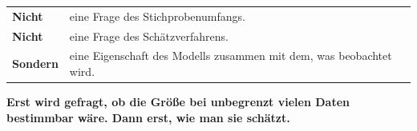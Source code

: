 \begin{merksatz}
\begin{center}
{\small
\renewcommand{\arraystretch}{1.52}
\begin{tabular}{@{}P{2.4cm}P{6.2cm}@{}}
\toprule
\textbf{Nicht} & eine Frage des Stichprobenumfangs.\\
\textbf{Nicht} & eine Frage des Schätzverfahrens.\\
\textbf{Sondern} & eine Eigenschaft des Modells zusammen mit dem, was beobachtet wird.\\
\bottomrule
\end{tabular}}
\end{center}

\begin{center}
\begin{minipage}{0.9\textwidth}
\textbf{Erst wird gefragt, ob die Größe bei unbegrenzt vielen Daten bestimmbar wäre. Dann erst, wie man sie schätzt.}
\end{minipage}
\end{center}

\begin{center}
\begin{minipage}{0.88\textwidth}
\end{minipage}
\end{center}
\end{merksatz}

